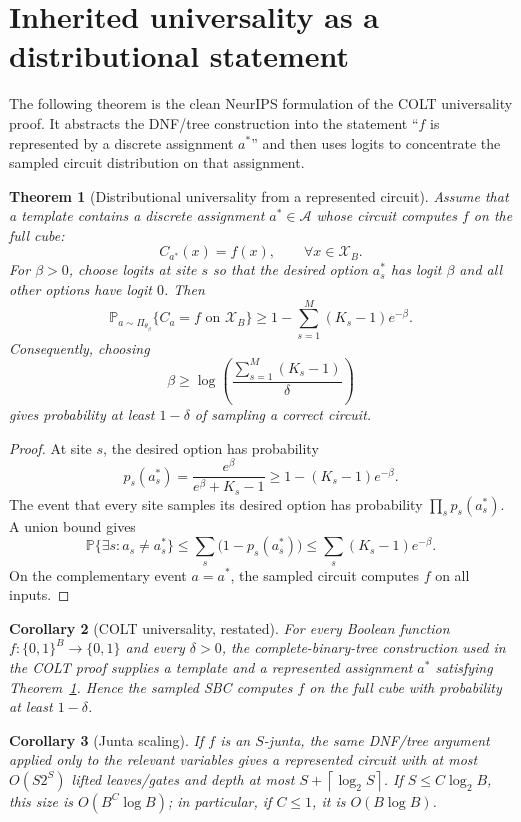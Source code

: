 \documentclass[11pt]{article}
\newtheorem{theorem}{Theorem}[section]
\newtheorem{corollary}[theorem]{Corollary}
\theoremstyle{definition}
\theoremstyle{remark}
\newcommand{\X}{\mathcal X}
\newcommand{\A}{\mathcal A}
\newcommand{\Pbb}{\mathbb P}
\newcommand{\SBC}{\textnormal{\textsc{SBC}}}
\newcommand{\bits}{\{0,1\}}
\newcommand{\ceil}[1]{\left\lceil #1 \right\rceil}
\begin{document}
\section{Inherited universality as a distributional statement}

The following theorem is the clean NeurIPS formulation of the COLT universality proof.  It abstracts the DNF/tree construction into the statement ``$f$ is represented by a discrete assignment $a^*$'' and then uses logits to concentrate the sampled circuit distribution on that assignment.

\begin{theorem}[Distributional universality from a represented circuit]
\label{thm:distributional-universality}
Assume that a template contains a discrete assignment $a^*\in\A$ whose circuit computes $f$ on the full cube:
\[
    C_{a^*}(x)=f(x),\qquad \forall x\in\X_B.
\]
For $\beta>0$, choose logits at site $s$ so that the desired option $a_s^*$ has logit $\beta$ and all other options have logit $0$.  Then
\[
    \Pbb_{a\sim\Pi_{\theta_\beta}}\{C_a=f\text{ on }\X_B\}
    \ge
    1-\sum_{s=1}^M (K_s-1)e^{-\beta}.
\]
Consequently, choosing
\[
    \beta\ge \log\!\left(\frac{\sum_{s=1}^M (K_s-1)}{\delta}\right)
\]
gives probability at least $1-\delta$ of sampling a correct circuit.
\end{theorem}

\begin{proof}
At site $s$, the desired option has probability
\[
    p_s(a_s^*)=\frac{e^\beta}{e^\beta+K_s-1}
    \ge 1-(K_s-1)e^{-\beta}.
\]
The event that every site samples its desired option has probability $\prod_s p_s(a_s^*)$.  A union bound gives
\[
    \Pbb\{\exists s: a_s\ne a_s^*\}
    \le \sum_s \bigl(1-p_s(a_s^*)\bigr)
    \le \sum_s (K_s-1)e^{-\beta}.
\]
On the complementary event $a=a^*$, the sampled circuit computes $f$ on all inputs.
\end{proof}

\begin{corollary}[COLT universality, restated]
For every Boolean function $f:\bits^B\to\bits$ and every $\delta>0$, the complete-binary-tree construction used in the COLT proof supplies a template and a represented assignment $a^*$ satisfying Theorem~\ref{thm:distributional-universality}.  Hence the sampled \SBC{} computes $f$ on the full cube with probability at least $1-\delta$.
\end{corollary}

\begin{corollary}[Junta scaling]
If $f$ is an $S$-junta, the same DNF/tree argument applied only to the relevant variables gives a represented circuit with at most $O(S2^S)$ lifted leaves/gates and depth at most $S+\ceil{\log_2 S}$.  If $S\le C\log_2 B$, this size is $O(B^C\log B)$; in particular, if $C\le1$, it is $O(B\log B)$.
\end{corollary}
\end{document}
